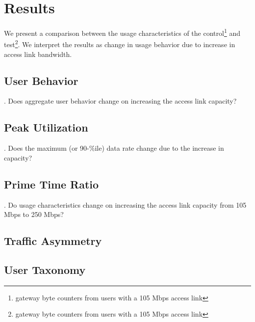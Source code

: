 \section{Results}
\label{sec:results}


We present a comparison between the usage characteristics of the control\footnote{gateway byte counters from users with a 105 Mbps access link} and test\footnote{gateway byte counters from users with a 105 Mbps access link}. We interpret the results as change in usage behavior due to increase in access link bandwidth. %

\subsection{User Behavior}
\label{subsec:behavior}

\hypoth{}. Does aggregate user behavior change on increasing the access link capacity?

\subsection{Peak Utilization}
\label{subsec:peak-util}

\hypoth{}. Does the maximum (or 90-\%ile) data rate change due to the increase in capacity?

\subsection{Prime Time Ratio}
\label{subsec:prime-time}

\hypoth{}. Do usage characteristics change on increasing the access link capacity from 105 Mbps to 250 Mbps?

\subsection{Traffic Asymmetry}
\label{subsec:asymmetry}



\subsection{User Taxonomy}
\label{subsec:taxonomy}

